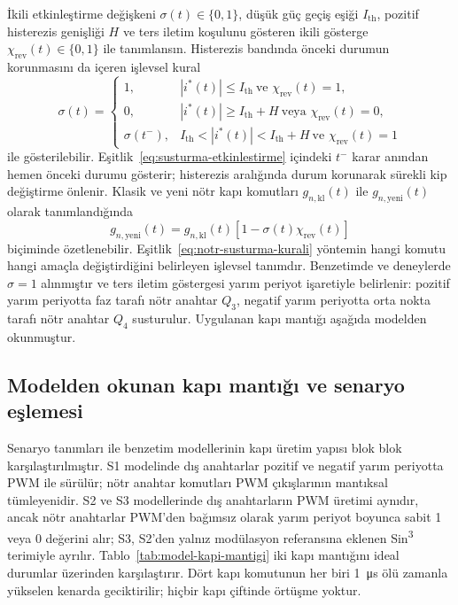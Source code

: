 İkili etkinleştirme değişkeni $\sigma(t)\in\{0,1\}$, düşük güç geçiş eşiği $I_{\mathrm{th}}$, pozitif histerezis genişliği $H$ ve ters iletim koşulunu gösteren ikili gösterge $\chi_{\mathrm{rev}}(t)\in\{0,1\}$ ile tanımlansın. Histerezis bandında önceki durumun korunmasını da içeren işlevsel kural
\begin{equation}
  \sigma(t)=
  \begin{cases}
    1, & |i^{\ast}(t)|\leq I_{\mathrm{th}}\ \text{ve }\chi_{\mathrm{rev}}(t)=1,\\
    0, & |i^{\ast}(t)|\geq I_{\mathrm{th}}+H\ \text{veya }\chi_{\mathrm{rev}}(t)=0,\\
    \sigma(t^-), & I_{\mathrm{th}}<|i^{\ast}(t)|<I_{\mathrm{th}}+H\ \text{ve }\chi_{\mathrm{rev}}(t)=1
  \end{cases}
  \label{eq:susturma-etkinlestirme}
\end{equation}
ile gösterilebilir. Eşitlik~\eqref{eq:susturma-etkinlestirme} içindeki $t^-$ karar anından hemen önceki durumu gösterir; histerezis aralığında durum korunarak sürekli kip değiştirme önlenir. Klasik ve yeni nötr kapı komutları $g_{n,\mathrm{kl}}(t)$ ile $g_{n,\mathrm{yeni}}(t)$ olarak tanımlandığında
\begin{equation}
  g_{n,\mathrm{yeni}}(t)=g_{n,\mathrm{kl}}(t)\left[1-\sigma(t)\chi_{\mathrm{rev}}(t)\right]
  \label{eq:notr-susturma-kurali}
\end{equation}
biçiminde özetlenebilir. Eşitlik~\eqref{eq:notr-susturma-kurali} yöntemin hangi komutu hangi amaçla değiştirdiğini belirleyen işlevsel tanımdır. Benzetimde ve deneylerde $\sigma=1$ alınmıştır ve ters iletim göstergesi yarım periyot işaretiyle belirlenir: pozitif yarım periyotta faz tarafı nötr anahtar $Q_3$, negatif yarım periyotta orta nokta tarafı nötr anahtar $Q_4$ susturulur. Uygulanan kapı mantığı aşağıda modelden okunmuştur.

\subsection{Modelden okunan kapı mantığı ve senaryo eşlemesi}
\label{sec:model-kapi-mantigi}

Senaryo tanımları ile benzetim modellerinin kapı üretim yapısı blok blok karşılaştırılmıştır. S1 modelinde dış anahtarlar pozitif ve negatif yarım periyotta PWM ile sürülür; nötr anahtar komutları PWM çıkışlarının mantıksal tümleyenidir. S2 ve S3 modellerinde dış anahtarların PWM üretimi aynıdır, ancak nötr anahtarlar PWM'den bağımsız olarak yarım periyot boyunca sabit 1 veya 0 değerini alır; S3, S2'den yalnız modülasyon referansına eklenen Sin\textsuperscript{3} terimiyle ayrılır. Tablo~\ref{tab:model-kapi-mantigi} iki kapı mantığını ideal durumlar üzerinden karşılaştırır. Dört kapı komutunun her biri \SI{1}{\micro\second} ölü zamanla yükselen kenarda geciktirilir; hiçbir kapı çiftinde örtüşme yoktur.

